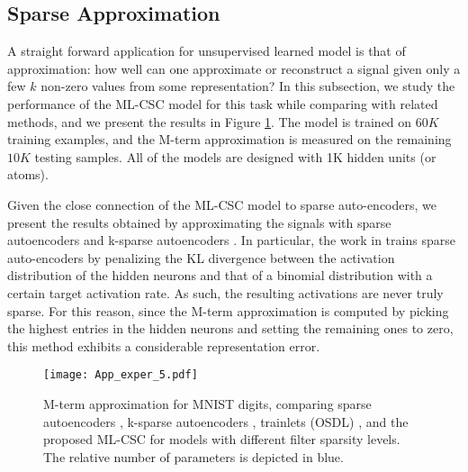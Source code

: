 \documentclass[10pt,journal]{IEEEtran}
\theoremstyle{plain}
\theoremstyle{definition}
\begin{document}
\subsection{Sparse Approximation}

A straight forward application for unsupervised learned model is that of approximation: how well can one approximate or reconstruct a signal given only a few $k$ non-zero values from some representation? In this subsection, we study the performance of the ML-CSC model for this task while comparing with related methods, and we present the results in Figure \ref{fig:MtermApp}. The model is trained on $60K$ training examples, and the M-term approximation is measured on the remaining $10K$ testing samples. All of the models are designed with 1K hidden units (or atoms).

Given the close connection of the ML-CSC model to sparse auto-encoders, we present the results obtained by approximating the signals with sparse autoencoders \cite{ng2011sparse} and k-sparse autoencoders \cite{makhzani2013k}. In particular, the work in \cite{ng2011sparse} trains sparse auto-encoders by penalizing the KL divergence between the activation distribution of the hidden neurons and that of a binomial distribution with a certain target activation rate. As such, the resulting activations are never truly sparse. For this reason, since the M-term approximation is computed by picking the highest entries in the hidden neurons and setting the remaining ones to zero, this method exhibits a considerable representation error.

\begin{figure}
	\begin{center}
		\texttt{[image: App\_exper\_5.pdf]}
		\caption{M-term approximation for MNIST digits, comparing sparse autoencoders \cite{ng2011sparse}, k-sparse autoencoders \cite{makhzani2013k}, trainlets (OSDL) \cite{Sulam2016}, and the proposed ML-CSC for models with different filter sparsity levels. The relative number of parameters is depicted in blue. }
		\label{fig:MtermApp}
	\end{center}
\end{figure}
\end{document}
